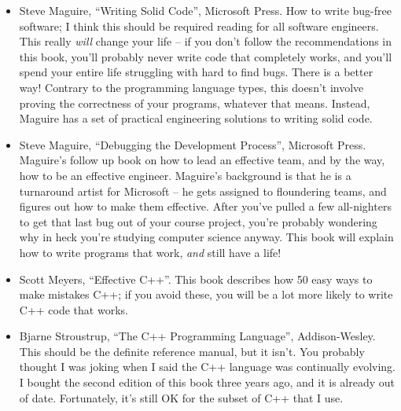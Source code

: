 \begin{itemize}
\item[] Steve Maguire, ``Writing Solid Code'', Microsoft Press.
How to write bug-free software; I think this should be required 
reading for all software engineers.  This really {\em will} change 
your life -- if you don't follow the recommendations in this book, 
you'll probably never write code that completely works, and you'll
spend your entire life struggling with hard to find bugs.  
There is a better way!  Contrary to the programming language types, 
this doesn't involve proving the correctness of your programs, whatever
that means.  Instead, Maguire has a set of practical engineering 
solutions to writing solid code.

\item[] Steve Maguire, ``Debugging the Development Process'', Microsoft Press.
Maguire's follow up book on how to lead an effective team, and
by the way, how to be an effective engineer.  Maguire's background is 
that he is a turnaround artist for Microsoft -- he gets assigned to 
floundering teams, and figures out how to make them effective.
After you've pulled a few all-nighters to get that last bug out
of your course project, you're probably wondering why in heck you're
studying computer science anyway.  This book will explain how
to write programs that work, {\em and} still have a life!

\item[] Scott Meyers, ``Effective C++''.  This book describes how
50 easy ways to make mistakes C++; if you avoid these, you will 
be a lot more likely to write C++ code that works.

\item[] Bjarne Stroustrup, ``The C++ Programming Language'', Addison-Wesley.
This should be the definite reference manual, but it isn't.
You probably thought I was joking when I said the C++ language was
continually evolving.  I bought the second edition of this
book three years ago, and it is already out of date.
Fortunately, it's still OK for the subset of C++ that I use.
\end{itemize}


